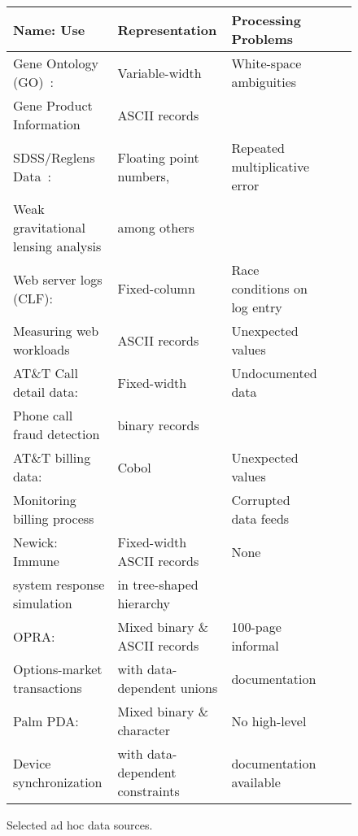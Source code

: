 \begin{figure*}
\begin{center}
\scriptsize
\begin{tabular}{@{}|l|l|l|l|l|}
\hline
Name: Use                           & Representation    & Processing Problems \\ \hline\hline
Gene Ontology (GO)~\cite{geneontology}:                  & Variable-width    & White-space ambiguities \\
Gene Product Information 	      & ASCII records &  \\ \hline
SDSS/Reglens Data~\cite{mandelbaum+:reglens}:                & Floating point numbers, & Repeated multiplicative error \\
Weak gravitational lensing analysis   & among others & \\ \hline
Web server logs (CLF):                & Fixed-column      & Race conditions on log entry\\ 
Measuring web workloads               & ASCII records     & Unexpected values\\ \hline
AT\&T Call detail data:                          & Fixed-width       & Undocumented data\\
Phone call fraud detection            & binary records  & \\ \hline 
AT\&T billing data:                 & Cobol             &  Unexpected values\\ 
Monitoring billing process          &                   & Corrupted data feeds \\ \hline
Newick:   Immune                    & Fixed-width ASCII records & None \\ 
system response simulation          & in tree-shaped hierarchy &\\ \hline                                
OPRA:                               & Mixed binary \& ASCII records 
                                                       & 100-page informal \\
Options-market transactions         & with data-dependent unions & documentation \\ \hline
Palm PDA:                           & Mixed binary \& character & No high-level  \\
Device synchronization              & with data-dependent constraints & documentation available\\ \hline
\end{tabular}
\caption{Selected ad hoc data sources.}
\label{figure:data-sources}
\end{center}
\end{figure*}

